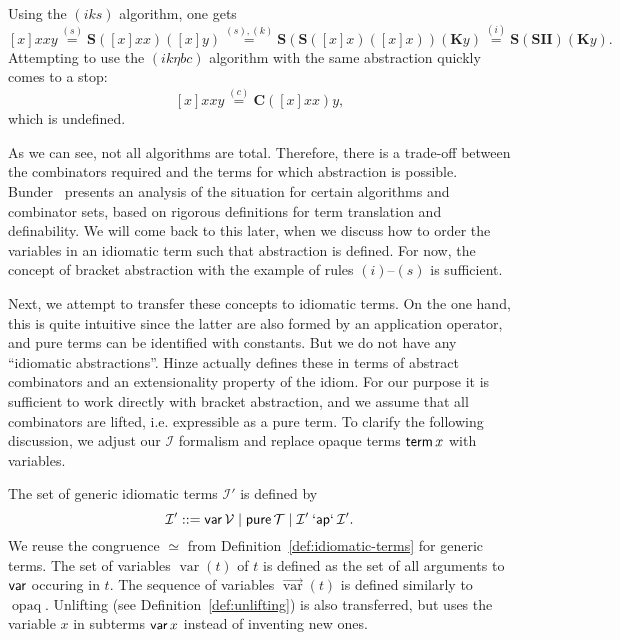 \begin{example}\label{exmp:bracket-abs}
Using the $(iks)$ algorithm, one gets
\[ [x]xxy \stackrel{(s)}{=} \mathbf{S}([x]xx)([x]y)
	\stackrel{(s),(k)}{=} \mathbf{S}(\mathbf{S}([x]x)([x]x))(\mathbf{K}y)
	\stackrel{(i)}{=} \mathbf{S}(\mathbf{SII})(\mathbf{K}y). \]
Attempting to use the $(ik\eta bc)$ algorithm with the same abstraction
quickly comes to a stop:
\[ [x]xxy \stackrel{(c)}{=} \mathbf{C}([x]xx)y, \]
which is undefined.
\end{example}

As we can see, not all algorithms are total.
Therefore, there is a trade-off between the combinators required and the terms
for which abstraction is possible.
Bunder~\cite{bunder96} presents an analysis of the situation for certain
algorithms and combinator sets, based on rigorous definitions for term
translation and definability.
We will come back to this later, when we discuss how to order the variables in
an idiomatic term such that abstraction is defined.
For now, the concept of bracket abstraction with the example of rules
$(i)$--$(s)$ is sufficient.

Next, we attempt to transfer these concepts to idiomatic terms.
On the one hand, this is quite intuitive since the latter are also formed by
an application operator, and pure terms can be identified with constants.
But we do not have any ``idiomatic abstractions''.
Hinze actually defines these in terms of abstract combinators and an
extensionality property of the idiom.
For our purpose it is sufficient to work directly with bracket abstraction,
and we assume that all combinators are lifted, i.e. expressible as a pure term.
To clarify the following discussion, we adjust our $\mathcal{I}$ formalism
and replace opaque terms $\operatorname{\mathsf{term}} x$ with variables.

\begin{definition}
The set of generic idiomatic terms $\mathcal{I}'$ is defined by
\begin{equation}
	\mathcal{I}' ::= \operatorname{\mathsf{var}} \mathcal{V} \mid \operatorname{\mathsf{pure}} \mathcal{T} \mid
		\mathcal{I}' \mathbin{\mathsf{`ap`}} \mathcal{I}'.
\end{equation}
We reuse the congruence $\simeq$ from Definition~\ref{def:idiomatic-terms} for
generic terms.
The set of variables $\operatorname{var}(t)$ of $t$ is defined as the set of
all arguments to $\operatorname{\mathsf{var}}$ occuring in $t$.
The sequence of variables $\overrightarrow{\operatorname{var}}(t)$ is defined
similarly to $\operatorname{opaq}$.
Unlifting (see Definition~\ref{def:unlifting}) is also transferred, but uses
the variable $x$ in subterms $\operatorname{\mathsf{var}} x$ instead of inventing new ones.
\end{definition}

